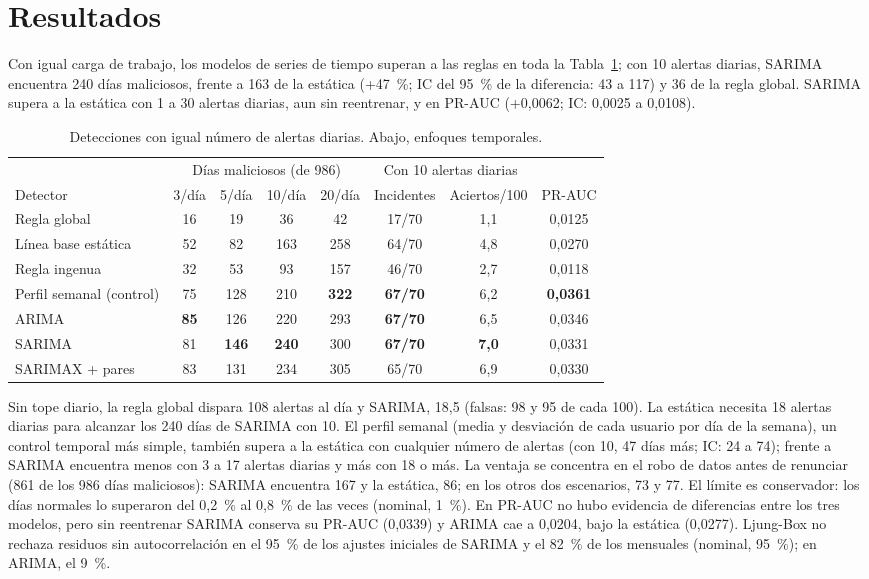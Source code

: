 \documentclass[runningheads,a4paper]{llncs}
\begin{document}
\section{Resultados}

Con igual carga de trabajo, los modelos de series de tiempo superan a las reglas en toda la Tabla~\ref{tab:abl}; con 10 alertas diarias, SARIMA encuentra 240 días maliciosos, frente a 163 de la estática (+47~\%; IC del 95~\% de la diferencia: 43 a 117) y 36 de la regla global. SARIMA supera a la estática con 1 a 30 alertas diarias, aun sin reentrenar, y en PR-AUC (+0,0062; IC: 0,0025 a 0,0108).

\begin{table}[t]
\caption{Detecciones con igual número de alertas diarias. Abajo, enfoques temporales.}
\label{tab:abl}
\centering\scriptsize
\setlength{\tabcolsep}{3.6pt}
\begin{tabular}{lccccccc}
\toprule
 & \multicolumn{4}{c}{Días maliciosos (de 986)} & \multicolumn{2}{c}{Con 10 alertas diarias} & \\
\cmidrule(lr){2-5}\cmidrule(lr){6-7}
Detector & 3/día & 5/día & 10/día & 20/día & Incidentes & Aciertos/100 & PR-AUC \\
\midrule
Regla global & 16 & 19 & 36 & 42 & 17/70 & 1,1 & 0,0125 \\
Línea base estática & 52 & 82 & 163 & 258 & 64/70 & 4,8 & 0,0270 \\
Regla ingenua & 32 & 53 & 93 & 157 & 46/70 & 2,7 & 0,0118 \\
\midrule
Perfil semanal (control) & 75 & 128 & 210 & \textbf{322} & \textbf{67/70} & 6,2 & \textbf{0,0361} \\
ARIMA & \textbf{85} & 126 & 220 & 293 & \textbf{67/70} & 6,5 & 0,0346 \\
SARIMA & 81 & \textbf{146} & \textbf{240} & 300 & \textbf{67/70} & \textbf{7,0} & 0,0331 \\
SARIMAX + pares & 83 & 131 & 234 & 305 & 65/70 & 6,9 & 0,0330 \\
\bottomrule
\end{tabular}
\end{table}

Sin tope diario, la regla global dispara 108 alertas al día y SARIMA, 18,5 (falsas: 98 y 95 de cada 100). La estática necesita 18 alertas diarias para alcanzar los 240 días de SARIMA con 10. El perfil semanal (media y desviación de cada usuario por día de la semana), un control temporal más simple, también supera a la estática con cualquier número de alertas (con 10, 47 días más; IC: 24 a 74); frente a SARIMA encuentra menos con 3 a 17 alertas diarias y más con 18 o más. La ventaja se concentra en el robo de datos antes de renunciar (861 de los 986 días maliciosos): SARIMA encuentra 167 y la estática, 86; en los otros dos escenarios, 73 y 77. El límite es conservador: los días normales lo superaron del 0,2~\% al 0,8~\% de las veces (nominal, 1~\%). En PR-AUC no hubo evidencia de diferencias entre los tres modelos, pero sin reentrenar SARIMA conserva su PR-AUC (0,0339) y ARIMA cae a 0,0204, bajo la estática (0,0277). Ljung-Box no rechaza residuos sin autocorrelación en el 95~\% de los ajustes iniciales de SARIMA y el 82~\% de los mensuales (nominal, 95~\%); en ARIMA, el 9~\%.
\end{document}
